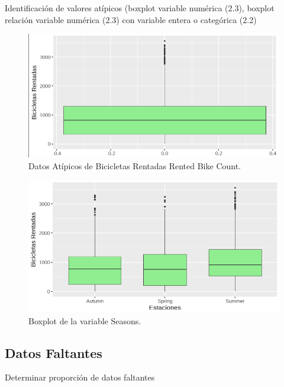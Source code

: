 \documentclass[]{elsarticle} %
\begin{document}
Identificación de valores atípicos (boxplot variable numérica (2.3),
boxplot relación variable numérica (2.3) con variable entera o
categórica (2.2)

\begin{figure}[H]

{\centering \includegraphics[width=1\linewidth]{datos_atypical} 

}

\caption{\label{fig:fig5}Datos Atípicos de Bicicletas Rentadas Rented Bike Count. }\label{fig:fig5}
\end{figure}
\begin{figure}[H]

{\centering \includegraphics[width=1\linewidth]{boxplot_seasons} 

}

\caption{\label{fig:fig6}Boxplot de la variable Seasons. }\label{fig:fig6}
\end{figure}
\newpage
\subsection{Datos Faltantes}

Determinar proporción de datos faltantes
\end{document}
